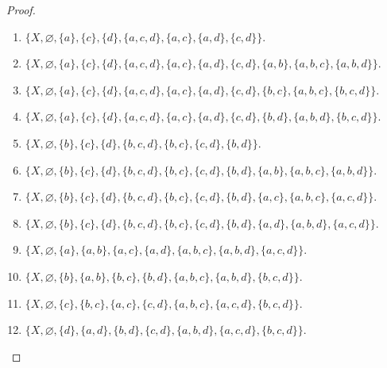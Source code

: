 \begin{proof}
\begin{enumerate}[label={(\roman*)}]
\begin{enumerate}[label={(\arabic*)}]
                  \item $\{ X, \varnothing, \{ a \}, \{ c \}, \{ d \}, \{ a, c, d \}, \{ a, c \}, \{ a, d \}, \{ c, d \} \}$.
                  \item $\{ X, \varnothing, \{ a \}, \{ c \}, \{ d \}, \{ a, c, d \}, \{ a, c \}, \{ a, d \}, \{ c, d \}, \{ a, b \}, \{ a, b, c \}, \{ a, b, d \} \}$.
                  \item $\{ X, \varnothing, \{ a \}, \{ c \}, \{ d \}, \{ a, c, d \}, \{ a, c \}, \{ a, d \}, \{ c, d \}, \{ b, c \}, \{ a, b, c \}, \{ b, c, d \} \}$.
                  \item $\{ X, \varnothing, \{ a \}, \{ c \}, \{ d \}, \{ a, c, d \}, \{ a, c \}, \{ a, d \}, \{ c, d \}, \{ b, d \}, \{ a, b, d \}, \{ b, c, d \} \}$.
                  \item $\{ X, \varnothing, \{ b \}, \{ c \}, \{ d \}, \{ b, c, d \}, \{ b, c \}, \{ c, d \}, \{ b, d \} \}$.
                  \item $\{ X, \varnothing, \{ b \}, \{ c \}, \{ d \}, \{ b, c, d \}, \{ b, c \}, \{ c, d \}, \{ b, d \}, \{ a, b \}, \{ a, b, c \}, \{ a, b, d \} \}$.
                  \item $\{ X, \varnothing, \{ b \}, \{ c \}, \{ d \}, \{ b, c, d \}, \{ b, c \}, \{ c, d \}, \{ b, d \}, \{ a, c \}, \{ a, b, c \}, \{ a, c, d \} \}$.
                  \item $\{ X, \varnothing, \{ b \}, \{ c \}, \{ d \}, \{ b, c, d \}, \{ b, c \}, \{ c, d \}, \{ b, d \}, \{ a, d \}, \{ a, b, d \}, \{ a, c, d \} \}$.
                  \item $\{ X, \varnothing, \{ a \}, \{ a, b \}, \{ a, c \}, \{ a, d \}, \{ a, b, c \}, \{ a, b, d \}, \{ a, c, d \} \}$.
                  \item $\{ X, \varnothing, \{ b \}, \{ a, b \}, \{ b, c \}, \{ b, d \}, \{ a, b, c \}, \{ a, b, d \}, \{ b, c, d \} \}$.
                  \item $\{ X, \varnothing, \{ c \}, \{ b, c \}, \{ a, c \}, \{ c, d \}, \{ a, b, c \}, \{ a, c, d \}, \{ b, c, d \} \}$.
                  \item $\{ X, \varnothing, \{ d \}, \{ a, d \}, \{ b, d \}, \{ c, d \}, \{ a, b, d \}, \{ a, c, d \}, \{ b, c, d \} \}$.
              \end{enumerate}
    \end{enumerate}
\end{proof}
\newpage

